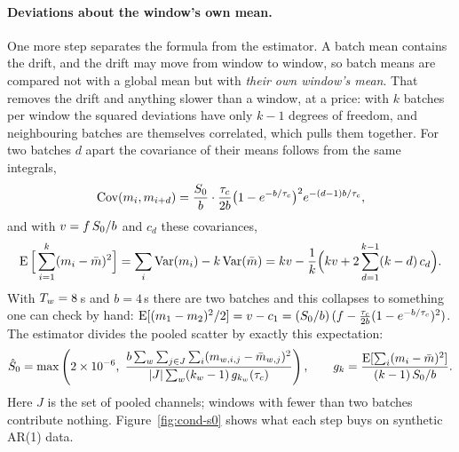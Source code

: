 \paragraph{Deviations about the window's own mean.} One more step separates the
formula from the estimator. A batch mean contains the drift, and the drift may
move from window to window, so batch means are compared not with a global mean but
with \emph{their own window's mean}. That removes the drift and anything slower
than a window, at a price: with $k$ batches per window the squared deviations have
only $k-1$ degrees of freedom, and neighbouring batches are themselves correlated,
which pulls them together. For two batches $d$ apart the covariance of their means
follows from the same integrals,
\[
  \operatorname{Cov}(m_i, m_{i+d}) = \frac{S_0}{b}\cdot\frac{\tau_c}{2b}\big(1-e^{-b/\tau_c}\big)^2 e^{-(d-1)b/\tau_c},
\]
and with $v = f\,S_0/b$ and $c_d$ these covariances,
\[
  \operatorname{E}\Big[\sum_{i=1}^k (m_i-\bar m)^2\Big] = \sum_i\operatorname{Var}(m_i) - k\operatorname{Var}(\bar m)
  = k v - \frac{1}{k}\Big(k v + 2\sum_{d=1}^{k-1}(k-d)\,c_d\Big).
\]
With $T_w = 8$\,s and $b = 4$\,s there are two batches and this collapses to
something one can check by hand:
$\operatorname{E}[(m_1-m_2)^2/2] = v - c_1 = (S_0/b)\,(f - \tfrac{\tau_c}{2b}(1-e^{-b/\tau_c})^2)$.
The estimator divides the pooled scatter by exactly this expectation:
\[
  \hat S_0 = \max\left(2\times10^{-6},\ \frac{b\sum_w\sum_{j\in J}\sum_i (m_{w,i,j}-\bar m_{w,j})^2}{|J|\sum_w (k_w-1)\,g_{k_w}(\tau_c)}\right),\qquad
  g_k = \frac{\E[\sum_i (m_i-\bar m)^2]}{(k-1)\,\Szero/b}.
\]
Here $J$ is the set of pooled channels; windows with fewer than two batches
contribute nothing. Figure~\ref{fig:cond-s0} shows what each step buys on synthetic AR(1) data.


